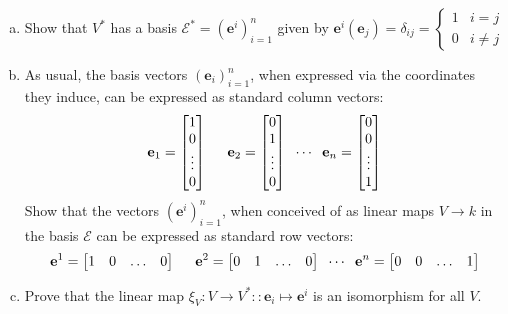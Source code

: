 \documentclass{amsart}
\theoremstyle{remark}
\theoremstyle{definition}
\theoremstyle{definition}
\begin{document}
\begin{enumerate}[(a)]
    \item Show that $V^*$ has a basis $\mathcal{E}^*=(\mathbf{e}^i)_{i=1}^n$ given by $\mathbf{e}^i(\mathbf{e}_j) = \delta_{ij} = \begin{cases} 1 & i=j \\ 0 & i\neq j \end{cases}$
    \item As usual, the basis vectors $(\mathbf{e}_i)_{i=1}^n$, when expressed via the coordinates they induce, can be expressed as standard column vectors:
    \[\mathbf{e}_1 = \begin{bmatrix} 1 \\ 0 \\ \vdots \\ 0 \end{bmatrix} \hspace{5 mm} \mathbf{e}_2 = \begin{bmatrix} 0 \\ 1 \\ \vdots \\ 0 \end{bmatrix} \hspace{2 mm} \cdots \hspace{2 mm} \mathbf{e}_n = \begin{bmatrix} 0 \\ 0 \\ \vdots \\ 1 \end{bmatrix}\]
    Show that the vectors $(\mathbf{e}^i)_{i=1}^n$, when conceived of as linear maps $V\to k$ in the basis $\mathcal{E}$ can be expressed as standard row vectors:
    \[\mathbf{e}^1 = \begin{bmatrix} 1 & 0 & \hdots & 0 \end{bmatrix} \hspace{5 mm} \mathbf{e}^2 = \begin{bmatrix} 0 & 1 & \hdots & 0 \end{bmatrix} \hspace{2 mm} \cdots \hspace{2 mm} \mathbf{e}^n = \begin{bmatrix} 0 & 0 & \hdots & 1 \end{bmatrix}\]
    \item Prove that the linear map $\xi_V:V\to V^*::\mathbf{e}_i\mapsto\mathbf{e}^i$ is an isomorphism for all $V$.
    

\end{enumerate}
\end{document}
